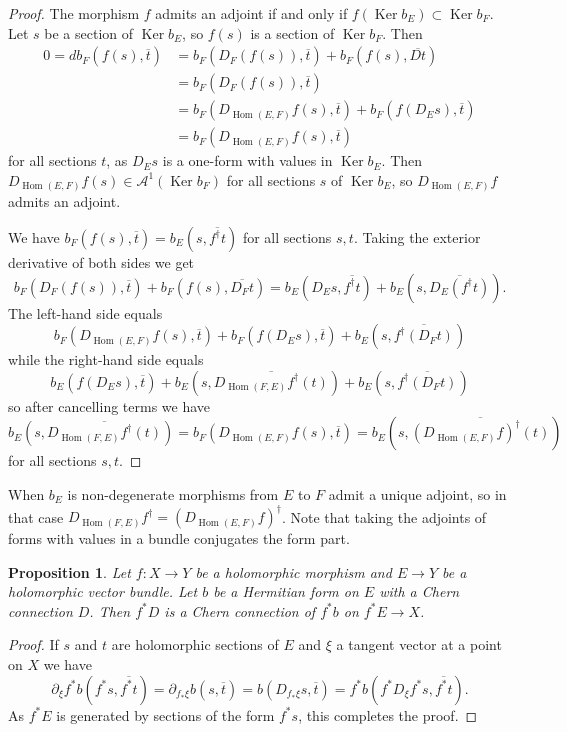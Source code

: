 \documentclass[10pt,a4paper]{amsart}
\newtheorem{prop}[theo]{Proposition}
\theoremstyle{definition}
\newcommand{\cc}[1]{\mathcal{#1}}
\def\ov#1{\overline{#1}}
\DeclareMathOperator{\Ker}{Ker}
\DeclareMathOperator{\Hom}{Hom}
\begin{document}
\begin{proof}
The morphism $f$ admits an adjoint if and only if $f(\Ker b_E) \subset \Ker b_F$. Let $s$ be a section of $\Ker b_E$, so $f(s)$ is a section of $\Ker b_F$. Then
\begin{align*}
0 = d b_F(f(s), \ov t)
&= b_F(D_F(f(s)), \ov t) + b_F(f(s), \ov{Dt})
\\
&= b_F(D_F(f(s)), \ov t)
\\
&= b_F(D_{\Hom(E,F)}f(s), \ov t) + b_F(f(D_Es), \ov t)
\\
&= b_F(D_{\Hom(E,F)}f(s), \ov t)
\end{align*}
for all sections $t$, as $D_Es$ is a one-form with values in $\Ker b_E$. Then $D_{\Hom(E,F)} f(s) \in \cc A^1(\Ker b_F)$ for all sections $s$ of $\Ker b_E$, so $D_{\Hom(E,F)}f$ admits an adjoint.

We have $b_F(f(s), \ov{t}) = b_E(s, \ov{f^\dagger t})$ for all sections $s,t$. Taking the exterior derivative of both sides we get
\[
b_F(D_F(f(s)), \ov t) + b_F(f(s), \ov{D_F t})
= b_E(D_E s, \ov {f^\dagger t}) + b_E(s, \ov{D_E(f^\dagger t)}).
\]
The left-hand side equals
\[
b_F(D_{\Hom(E,F)}f(s), \ov t)
+ b_F(f(D_Es), \ov t)
+ b_E(s, \ov{f^\dagger(D_F t)})
\]
while the right-hand side equals
\[
b_E(f(D_E s), \ov t)
+ b_E(s, \ov{D_{\Hom(F,E)}f^\dagger(t)})
+ b_E(s, \ov{f^\dagger(D_F t)})
\]
so after cancelling terms we have
\[
b_E(s, \ov{D_{\Hom(F,E)}f^\dagger(t)})
= b_F(D_{\Hom(E,F)}f(s), \ov t)
= b_E(s, \ov{(D_{\Hom(E,F)}f)^\dagger(t)})
\]
for all sections $s,t$.
\end{proof}

When $b_E$ is non-degenerate morphisms from $E$ to $F$ admit a unique adjoint, so in that case $D_{\Hom(F,E)}f^\dagger = (D_{\Hom(E,F)}f)^\dagger$. Note that taking the adjoints of forms with values in a bundle conjugates the form part.



\begin{prop}
Let $f : X \to Y$ be a holomorphic morphism and $E \to Y$ be a holomorphic vector bundle.
Let $b$ be a Hermitian form on $E$ with a Chern connection $D$.
Then $f^{*}D$ is a Chern connection of $f^{*}b$ on $f^{*}E \to X$.
\end{prop}


\begin{proof}
If $s$ and $t$ are holomorphic sections of $E$ and $\xi$ a tangent vector at a
point on $X$ we have
\[
\partial_{\xi} f^{*} b(f^{*}s, \overline{f^{*}t})
= \partial_{f_{*}\xi} b(s, \overline t)
= b(D_{f_{*}\xi}s, \overline{t})
= f^{*}b(f^{*}D_{\xi} f^{*}s, \overline{f^{*}t}).
\]
As $f^{*}E$ is generated by sections of the form $f^{*}s$, this completes the proof.
\end{proof}
\end{document}
